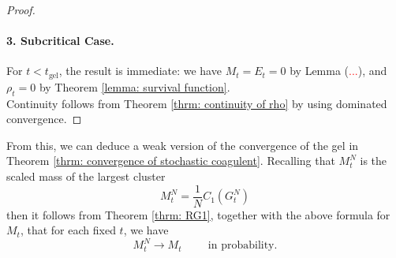 \begin{proof}
\paragraph{3. Subcritical Case.} For $t<t_\text{gel}$, the result is immediate: we have $M_t=E_t=0$ by Lemma (\textcolor{red}{...}), and $\rho_t=0$ by Theorem \ref{lemma: survival function}. \medskip \\ Continuity follows from Theorem \ref{thrm: continuity of rho} by using dominated convergence. \end{proof}
\begin{remark} From this, we can deduce a weak version of the convergence of the gel in Theorem \ref{thrm: convergence of stochastic coagulent}. Recalling that $M^N_t$ is the scaled mass of the largest cluster \begin{equation}
    M^N_t=\frac{1}{N}C_1(G^N_t)
\end{equation} then it follows from Theorem \ref{thrm: RG1}, together with the above formula for $M_t$, that for each fixed $t$, we have \begin{equation}
    M^N_t \rightarrow M_t \hspace{1cm} \text{in probability.}
\end{equation} \end{remark}

